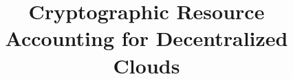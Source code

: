 \documentclass[10pt, conference]{IEEEtran}
\begin{document}
\title{Cryptographic Resource Accounting for Decentralized Clouds}

\maketitle

%       









%
%

%
\end{document}
